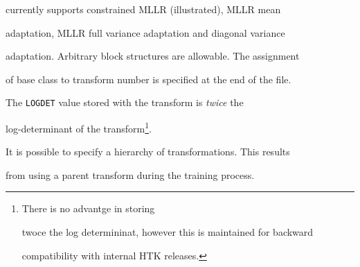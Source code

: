 currently supports constrained MLLR (illustrated), MLLR mean


adaptation, MLLR full variance adaptation and diagonal variance


adaptation.  Arbitrary block structures are allowable.  The assignment


of base class to transform number is specified at the end of the file.





The {\tt LOGDET} value stored with the transform is {\em twice} the 


log-determinant of the transform\footnote{There is no advantge in storing 


twoce the log determininat, however this is maintained for backward


compatibility with internal HTK releases.}.







It is possible to specify a hierarchy of transformations. This results


from using a parent transform during the training process.


